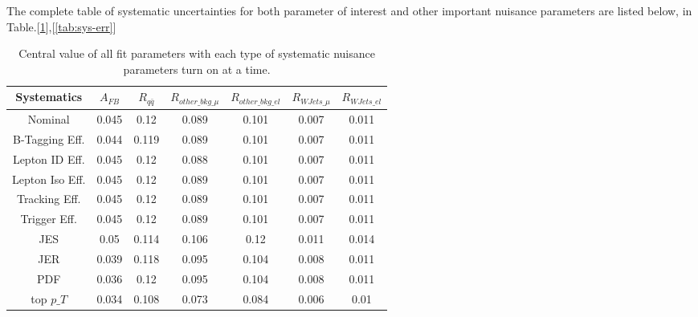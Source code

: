 \documentclass{cmspaperpdf}
\begin{document}
The complete table of systematic uncertainties for both parameter of interest and other important nuisance parameters are listed below, in Table.[\ref{tab:sys-full}],[\ref{tab:sys-err}]

\begin{table}[htb]
\centering
\begin{tabular}{c|cc|cccc}
Systematics &      $A_{FB}$ &   $R_{q\bar{q}}$ & $R_{other\_bkg\_\mu}$ & $R_{other\_bkg\_el}$ & $R_{WJets\_\mu}$ & $R_{WJets\_el}$ \\
\hline
Nominal         &  0.045 &   0.12 &          0.089 &          0.101 &      0.007 &      0.011 \\
\hline
B-Tagging Eff.  &  0.044 &  0.119 &          0.089 &          0.101 &      0.007 &      0.011 \\
Lepton ID Eff.  &  0.045 &   0.12 &          0.088 &          0.101 &      0.007 &      0.011 \\
Lepton Iso Eff. &  0.045 &   0.12 &          0.089 &          0.101 &      0.007 &      0.011 \\
Tracking Eff.   &  0.045 &   0.12 &          0.089 &          0.101 &      0.007 &      0.011 \\
Trigger Eff.    &  0.045 &   0.12 &          0.089 &          0.101 &      0.007 &      0.011 \\
\hline
JES             &   0.05 &  0.114 &          0.106 &           0.12 &      0.011 &      0.014 \\
JER             &  0.039 &  0.118 &          0.095 &          0.104 &      0.008 &      0.011 \\
PDF             &  0.036 &   0.12 &          0.095 &          0.104 &      0.008 &      0.011 \\
\hline
top $p\_T$         &  0.034 &  0.108 &          0.073 &          0.084 &      0.006 &       0.01 \\
\hline
\end{tabular}
\caption{Central value of all fit parameters with each type of systematic nuisance parameters turn on at a time.}
\label{tab:sys-full}
\end{table}
\end{document}

